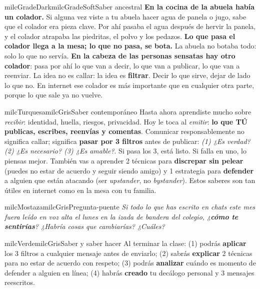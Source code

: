 \documentclass[11pt,letterpaper]{article}
\begin{document}
\begin{softbox}{milcGradeDark}{milcGradeSoft}{Saber ancestral}
\textbf{En la cocina de la abuela había un colador.} Si alguna vez viste a tu abuela hacer agua de panela o jugo, sabe que el colador era pieza clave. Por ahí pasaba el agua después de hervir la panela, y el colador atrapaba las piedritas, el polvo y los pedazos. \textbf{Lo que pasa el colador llega a la mesa; lo que no pasa, se bota.} La abuela no botaba todo: solo lo que no servía. \textbf{En la cabeza de las personas sensatas hay otro colador}: pasa por ahí lo que van a decir, lo que van a publicar, lo que van a reenviar. La idea no es callar: la idea es \textbf{filtrar}. Decir lo que sirve, dejar de lado lo que no. En internet ese colador es más importante que en cualquier otra parte, porque lo que sale ya no vuelve.
\end{softbox}

\begin{softbox}{milcTurquesa}{milcGris}{Saber contemporáneo}
Hasta ahora aprendiste mucho sobre \emph{recibir}: identidad, huella, riesgos, privacidad. Hoy le toca al \emph{emitir}: \textbf{lo que TÚ publicas, escribes, reenvías y comentas}. Comunicar responsablemente no significa callar; significa \textbf{pasar por 3 filtros} antes de publicar: \emph{(1) ¿Es verdad? (2) ¿Es necesario? (3) ¿Es amable?}. Si pasa los 3, está listo. Si falla en uno, lo piensas mejor. También vas a aprender 2 técnicas para \textbf{discrepar sin pelear} (puedes no estar de acuerdo y seguir siendo amigo) y 1 estrategia para \textbf{defender} a alguien que están atacando (ser \emph{upstander}, no \emph{bystander}). Estos saberes son tan útiles en internet como en la mesa con tu familia.
\end{softbox}

\begin{softbox}{milcMostaza}{milcGris}{Pregunta-puente}
\textit{Si todo lo que has escrito en chats este mes fuera leído en voz alta el lunes en la izada de bandera del colegio, ¿\textbf{cómo te sentirías}? ¿Habría cosas que cambiarías? ¿Cuáles?}
\end{softbox}

\begin{softbox}{milcVerde}{milcGris}{Saber y saber hacer}
Al terminar la clase: (1) podrás \textbf{aplicar} los 3 filtros a cualquier mensaje antes de enviarlo; (2) sabrás \textbf{explicar} 2 técnicas para no estar de acuerdo con respeto; (3) podrás \textbf{analizar} cuándo es momento de defender a alguien en línea; (4) habrás \textbf{creado} tu decálogo personal y 3 mensajes reescritos.
\end{softbox}
\end{document}
